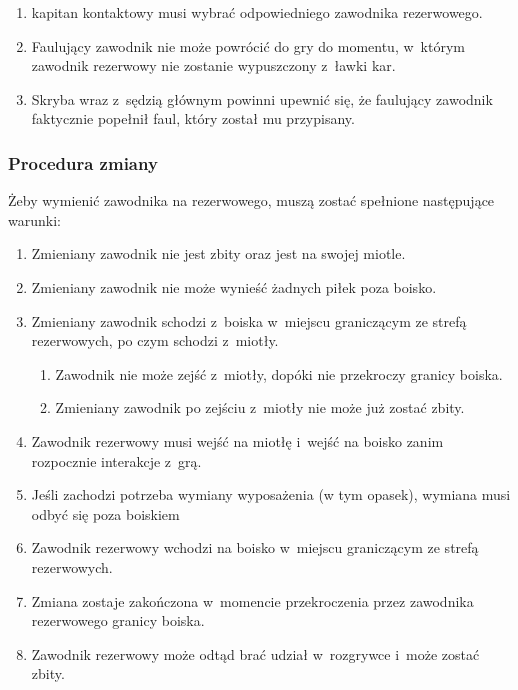 \documentclass[12pt]{article}
\begin{document}
\begin{enumerate}
\begin{enumerate}
		            \begin{enumerate}
			            \item
			                  kapitan kontaktowy musi wybrać odpowiedniego zawodnika
			                  rezerwowego.
			            \item
			                  Faulujący zawodnik nie może powrócić do gry do momentu, w~którym
			                  zawodnik rezerwowy nie zostanie wypuszczony z~ławki kar.
			            \item
			                  Skryba wraz z~sędzią głównym powinni upewnić się, że faulujący
			                  zawodnik faktycznie popełnił faul, który został mu przypisany.
		            \end{enumerate}
	      \end{enumerate}
\end{enumerate}

\subsubsection{Procedura zmiany}

Żeby wymienić zawodnika na rezerwowego, muszą zostać spełnione
następujące warunki:

\begin{enumerate}
	\item
	      Zmieniany zawodnik nie jest zbity oraz jest na swojej miotle.
	\item
	      Zmieniany zawodnik nie może wynieść żadnych piłek poza boisko.
	\item
	      Zmieniany zawodnik schodzi z~boiska w~miejscu graniczącym ze strefą
	      rezerwowych, po czym schodzi z~miotły.

	      \begin{enumerate}
		      \item
		            Zawodnik nie może zejść z~miotły, dopóki nie przekroczy granicy
		            boiska.
		      \item
		            Zmieniany zawodnik po zejściu z~miotły nie może już zostać zbity.
	      \end{enumerate}
	\item
	      Zawodnik rezerwowy musi wejść na miotłę i~wejść na boisko zanim
	      rozpocznie interakcje z~grą.
	\item
	      Jeśli zachodzi potrzeba wymiany wyposażenia (w tym opasek), wymiana
	      musi odbyć się poza boiskiem
	\item
	      Zawodnik rezerwowy wchodzi na boisko w~miejscu graniczącym ze strefą
	      rezerwowych.
	\item
	      Zmiana zostaje zakończona w~momencie przekroczenia przez zawodnika
	      rezerwowego granicy boiska.
	\item
	      Zawodnik rezerwowy może odtąd brać udział w~rozgrywce i~może zostać
	      zbity.
\end{enumerate}
\end{document}
